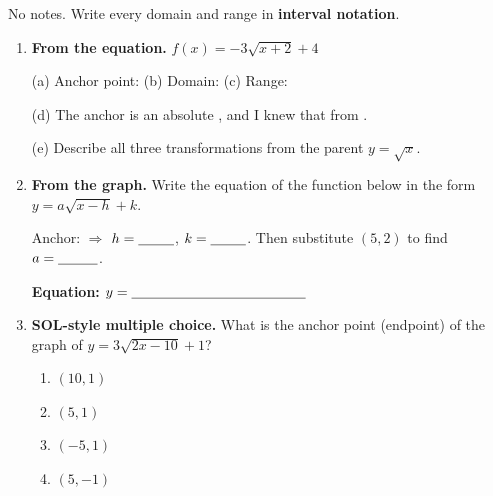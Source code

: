 \documentclass[10pt]{article}
\newcommand{\lgrid}[4]{%
  \draw[step=1, linegray!40, very thin] (#1,#3) grid (#2,#4);
  \draw[->, semithick, charcoal] (#1,0)--(#2,0) node[below right, font=\scriptsize]{$x$};
  \draw[->, semithick, charcoal] (0,#3)--(0,#4) node[left, font=\scriptsize]{$y$};}
\begin{document}
\namedateperiod

\vspace{0.08in}

No notes. Write every domain and range in \textbf{interval notation}.

\begin{enumerate}[leftmargin=1.8em, itemsep=9pt]
  \item \textbf{From the equation.} \; $f(x)=-3\sqrt{x+2}+4$

        \vspace{3pt}
        (a) Anchor point: \blank{2.0cm} \hspace{0.3in}
        (b) Domain: \blank{2.6cm} \hspace{0.3in}
        (c) Range: \blank{2.6cm}

        \vspace{5pt}
        (d) The anchor is an absolute \blank{1.8cm}, and I knew that from \blank{3.6cm}.

        \vspace{5pt}
        (e) Describe all three transformations from the parent $y=\sqrt{x}$. \writeline

  \item \textbf{From the graph.} Write the equation of the function below in the form
        $y=a\sqrt{x-h}+k$.
        \begin{center}
        \end{center}
        \vspace{-6pt}
        Anchor: \blank{1.8cm} \; $\Rightarrow$ \; $h=\blank{0.9cm}$, $k=\blank{0.9cm}$. \quad
        Then substitute $(5,2)$ to find $a=\blank{1.0cm}$.

        \vspace{4pt}
        \textbf{Equation:} $y=\blank{4.4cm}$

  \item \textbf{SOL-style multiple choice.} What is the anchor point (endpoint) of the graph of
        $y=3\sqrt{2x-10}+1$?
        \begin{enumerate}[label=\Alph*., leftmargin=1.9em, itemsep=1pt]
          \item $(10,1)$
          \item $(5,1)$
          \item $(-5,1)$
          \item $(5,-1)$
        \end{enumerate}
\end{enumerate}
\end{document}
